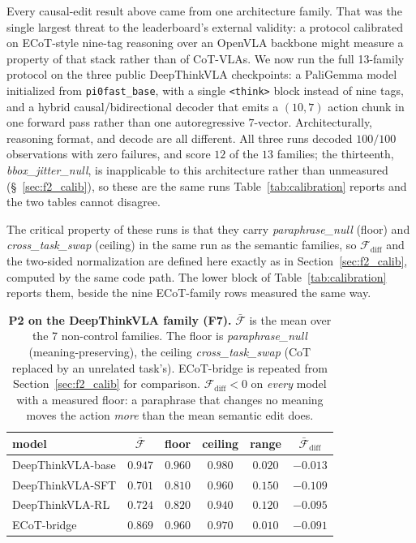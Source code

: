 \documentclass{article}
\begin{document}
Every causal-edit result above came from one architecture family. That was the single largest threat to the leaderboard's external validity: a protocol calibrated on ECoT-style nine-tag reasoning over an OpenVLA backbone might measure a property of that stack rather than of CoT-VLAs. We now run the full 13-family protocol on the three public DeepThinkVLA checkpoints: a PaliGemma model initialized from \texttt{pi0fast\_base}, with a single \texttt{<think>} block instead of nine tags, and a hybrid causal/bidirectional decoder that emits a $(10,7)$ action chunk in one forward pass rather than one autoregressive $7$-vector. Architecturally, reasoning format, and decode are all different. All three runs decoded $100/100$ observations with zero failures, and score $12$ of the $13$ families; the thirteenth, \emph{bbox\_jitter\_null}, is inapplicable to this architecture rather than unmeasured (\S~\ref{sec:f2_calib}), so these are the same runs Table~\ref{tab:calibration} reports and the two tables cannot disagree.

The critical property of these runs is that they carry \emph{paraphrase\_null} (floor) and \emph{cross\_task\_swap} (ceiling) in the same run as the semantic families, so $\mathcal{F}_{\text{diff}}$ and the two-sided normalization are defined here exactly as in Section~\ref{sec:f2_calib}, computed by the same code path. The lower block of Table~\ref{tab:calibration} reports them, beside the nine ECoT-family rows measured the same way.

\begin{table}[t]
\centering
\small
\caption{\textbf{P2 on the DeepThinkVLA family (F7).} $\bar{\mathcal{F}}$ is the mean over the 7 non-control families. The floor is \emph{paraphrase\_null} (meaning-preserving), the ceiling \emph{cross\_task\_swap} (CoT replaced by an unrelated task's). ECoT-bridge is repeated from Section~\ref{sec:f2_calib} for comparison. $\mathcal{F}_{\text{diff}} < 0$ on \emph{every} model with a measured floor: a paraphrase that changes no meaning moves the action \emph{more} than the mean semantic edit does.}
\label{tab:crossfamily}
\begin{tabular}{lccccc}
\toprule
model & $\bar{\mathcal{F}}$ & floor & ceiling & range & $\bar{\mathcal{F}}_{\text{diff}}$ \\
\midrule
DeepThinkVLA-base & $0.947$ & $0.960$ & $0.980$ & $0.020$ & $-0.013$ \\
DeepThinkVLA-SFT  & $0.701$ & $0.810$ & $0.960$ & $0.150$ & $-0.109$ \\
DeepThinkVLA-RL   & $0.724$ & $0.820$ & $0.940$ & $0.120$ & $-0.095$ \\
\midrule
ECoT-bridge & $0.869$ & $0.960$ & $0.970$ & $0.010$ & $-0.091$ \\
\bottomrule
\end{tabular}
\end{table}
\end{document}
